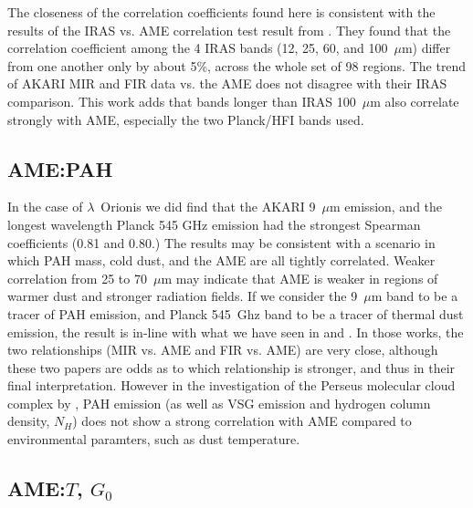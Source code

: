 \documentclass[preprint2,longabstract]{aastex}
\begin{document}
        The closeness of the correlation coefficients found here is consistent with the results of the IRAS vs. AME correlation test result from \cite{planckXV}. They found that the correlation coefficient among the 4 IRAS bands (12, 25, 60, and 100~$\mu$m) differ from one another only by about 5\%, across the whole set of 98 regions. The trend of AKARI MIR and FIR data vs. the AME does not disagree with their IRAS comparison. This work adds that bands longer than IRAS 100~$\mu$m also correlate strongly with AME, especially the two Planck/HFI bands used.

      \subsection{AME:PAH}

        In the case of $\lambda$~Orionis we did find that the AKARI 9~$\mu$m emission, and the longest wavelength Planck 545 GHz emission had the strongest Spearman coefficients (0.81 and 0.80.)  The results may be consistent with a scenario in which PAH mass, cold dust, and the AME are all tightly correlated. Weaker correlation from 25 to 70~$\mu$m may indicate that AME is weaker in regions of warmer dust and stronger radiation fields. If we consider the 9~$\mu$m band to be a tracer of PAH emission, and Planck 545~Ghz band to be a tracer of thermal dust emission, the result is in-line with what we have seen in \cite{ysard10b} and \cite{hensley16}. In those works, the two relationships (MIR vs. AME and FIR vs. AME) are very close, although these two papers are odds as to which relationship is stronger, and thus in their final interpretation. However in the investigation of the Perseus molecular cloud complex by \cite{tibbs11}, PAH emission (as well as VSG emission and hydrogen column density, $N_{H}$) does not show a strong correlation with AME compared to environmental paramters, such as dust temperature.


      \subsection{AME:$T$, $G_{0}$}
\end{document}
